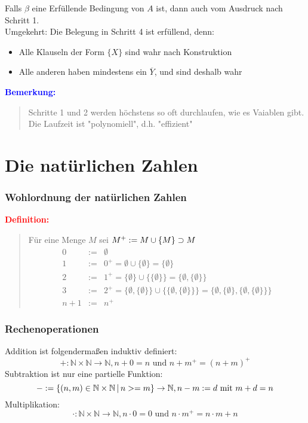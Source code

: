 \documentclass{article}
\newcommand{\smsp}{\phantom{\hspace{3px}}}
\newcommand{\red}[1]{\textcolor{red}{#1}}
\newcommand{\blue}[1]{\textcolor{blue}{#1}}
\newcommand{\de}[1]{\red{\textbf{Definition: }}\begin{quote}#1\end{quote}}
\newcommand{\an}[1]{\blue{\textbf{Bemerkung: }}\begin{quote}#1\end{quote}}
\newcommand{\n}[1]{\overline{#1}}
\newcommand{\N}{\mathbb{N}}
\newcommand{\vst}{\smsp \vline \smsp}
\begin{document}
Falls $\beta$ eine Erfüllende Bedingung von $A$ ist, dann auch vom Ausdruck nach Schritt 1.\\
Umgekehrt: Die Belegung in Schritt 4 ist erfüllend, denn:
\begin{itemize}
    \item Alle Klauseln der Form $\{X\}$ sind wahr nach Konstruktion
    \item Alle anderen haben mindestens ein $\n{Y}$, und sind deshalb wahr
\end{itemize}

\an{
    Schritte 1 und 2 werden höchstens so oft durchlaufen, wie es Vaiablen gibt.\\
    Die Laufzeit ist "polynomiell", d.h. "effizient"
}


\section{Die natürlichen Zahlen}
{}
\subsubsection{Wohlordnung der natürlichen Zahlen}

\de{
    Für eine Menge $M$ sei $M^+ := M \cup \{M\} \mathrel{\reflectbox{$\subset$}} M$
    \[
        \begin{array}{lcl}
            0 &:=& \emptyset\\
            1 &:=& 0^+ = \emptyset \cup \{\emptyset\} = \{\emptyset\}\\
            2 &:=& 1^+ = \{\emptyset\} \cup \{\{\emptyset\}\} = \{\emptyset, \{\emptyset\}\}\\
            3 &:=& 2^+ = \{\emptyset, \{\emptyset\}\} \cup \{\{\emptyset, \{\emptyset\}\}\} = \{\emptyset, \{\emptyset\}, \{\emptyset, \{\emptyset\}\}\}\\
            n+1 &:=& n^+
        \end{array}
    \]
}

\subsubsection{Rechenoperationen}

Addition ist folgendermaßen induktiv definiert:
\[
    +: \N \times \N \to \N, n + 0 = n \text{ und } n + m^+ = (n + m)^+
\]
Subtraktion ist nur eine partielle Funktion:
\[
    - := \{(n, m) \in \N \times \N \vst n >= m\} \to \N, n - m := d \text{ mit } m + d = n
\]
Multiplikation:
\[
    \cdot: \N \times \N \to \N, n \cdot 0 = 0 \text{ und } n \cdot m^+ = n \cdot m + n
\]
\end{document}
